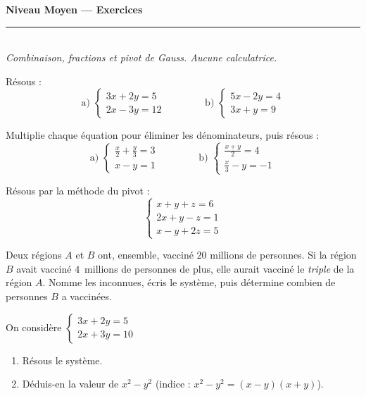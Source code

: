 \documentclass[11pt,a4paper]{article}
\newcommand{\ds}{\displaystyle}
\begin{document}
\begin{center}
{\LARGE\bfseries\color{primarydark} Niveau Moyen — Exercices}\\[2pt]
{\color{primary}\rule{0.45\textwidth}{1.2pt}}\\[3pt]
{\small\itshape Combinaison, fractions et pivot de Gauss. Aucune calculatrice.}
\end{center}
\vspace{1mm}

\begin{exo}
Résous :
\[ \text{a) }\begin{cases} 3x+2y=5\\ 2x-3y=12\end{cases}\qquad\qquad
   \text{b) }\begin{cases} 5x-2y=4\\ 3x+y=9\end{cases} \]
\end{exo}

\begin{exo}
Multiplie chaque équation pour éliminer les dénominateurs, puis résous :
\[ \text{a) }\begin{cases} \ds\frac{x}{2}+\frac{y}{3}=3\\[4pt] x-y=1\end{cases}\qquad\qquad
   \text{b) }\begin{cases} \ds\frac{x+y}{2}=4\\[4pt] \ds\frac{x}{3}-y=-1\end{cases} \]
\end{exo}

\begin{exo}
Résous par la méthode du pivot :
\[ \begin{cases} x+y+z=6\\ 2x+y-z=1\\ x-y+2z=5\end{cases} \]
\end{exo}

\begin{exo}
Deux régions $A$ et $B$ ont, ensemble, vacciné $20$ millions de personnes. Si la région $B$ avait
vacciné $4$~millions de personnes de plus, elle aurait vacciné le \emph{triple} de la région $A$.
Nomme les inconnues, écris le système, puis détermine combien de personnes $B$ a vaccinées.
\end{exo}

\begin{exo}
On considère $\ds\begin{cases} 3x+2y=5\\ 2x+3y=10\end{cases}$
\begin{enumerate}[label=\alph*),leftmargin=2em,topsep=1pt,itemsep=1pt]
  \item Résous le système.
  \item Déduis-en la valeur de $x^{2}-y^{2}$ (indice : $x^{2}-y^{2}=(x-y)(x+y)$).
\end{enumerate}
\end{exo}
\end{document}
